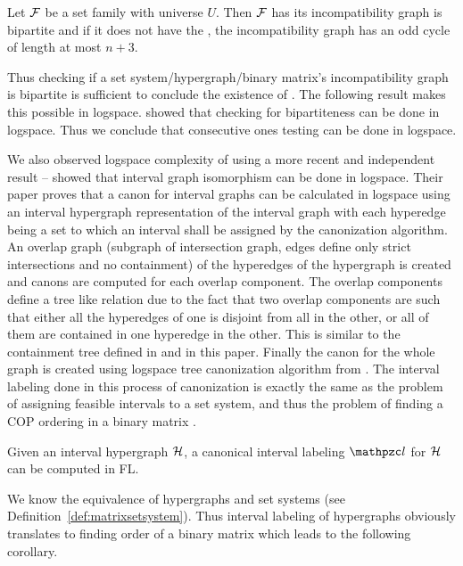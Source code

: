 \begin{theoremsansproof} 
  \label{th:mccbipartiterecall}
  Let ${\cal F}$ be a set family with universe $U$. Then ${\cal F}$ has \COP
  \iff its incompatibility graph is bipartite and if it does not have
  the \COP, the incompatibility graph has an odd cycle of length at
  most $n+3$.
\end{theoremsansproof}
 
Thus checking if a set system/hypergraph/binary matrix's
incompatibility graph is bipartite is sufficient to conclude the
existence of \COP. The following result makes this possible in
logspace. \cite{rei84} showed that checking for bipartiteness can be
done in logspace. Thus we conclude that consecutive ones testing can
be done in logspace.


We also observed logspace complexity of \COP using a more recent and
independent result -- \cite{kklv10} showed that interval graph
isomorphism can be done in logspace. Their paper proves that a canon
for interval graphs can be calculated in logspace using an interval
hypergraph representation of the interval graph with each hyperedge
being a set to which an interval shall be assigned by the canonization
algorithm. An overlap graph (subgraph of intersection graph, edges
define only strict intersections and no containment) of the hyperedges
of the hypergraph is created and canons are computed for each overlap
component. The overlap components define a tree like relation due to
the fact that two overlap components are such that either all the
hyperedges of one is disjoint from all in the other, or all of them
are contained in one hyperedge in the other. This is similar to the
containment tree defined in \cite{nsnrs09} and in this paper. Finally
the canon for the whole graph is created using logspace tree
canonization algorithm from \cite{sl92}. The interval labeling done in
this process of canonization is exactly the same as the problem of
assigning feasible intervals to a set system, and thus the problem of
finding a COP ordering in a binary matrix \cite{nsnrs09}.

\begin{theorem}
  \label{th:canonlabel}
  Given an interval hypergraph ${\cal H}$, a canonical interval labeling
  $\cl$ for ${\cal H}$ can be computed in {\sc FL}.
\end{theorem}

We know the equivalence of hypergraphs and set systems (see
Definition~\ref{def:matrixsetsystem}). Thus interval labeling of
hypergraphs obviously translates to finding \COP order of a binary
matrix which leads to the following corollary.

